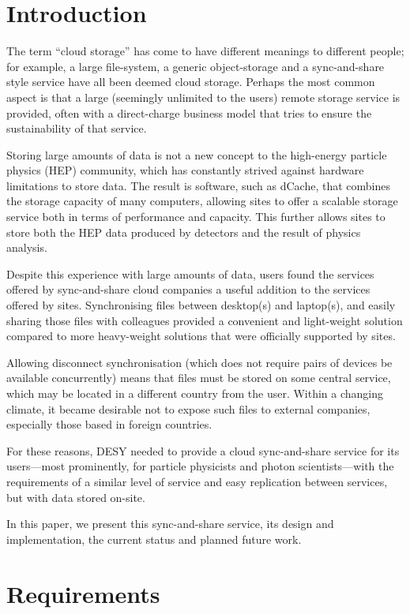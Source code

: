 \documentclass[a4paper]{jpconf}
\begin{document}
\section{Introduction}

The term ``cloud storage'' has come to have different meanings to
different people; for example, a large file-system, a generic
object-storage and a sync-and-share style service have all been deemed
cloud storage.  Perhaps the most common aspect is that a large
(seemingly unlimited to the users) remote storage service is provided,
often with a direct-charge business model that tries to ensure the
sustainability of that service.

Storing large amounts of data is not a new concept to the high-energy
particle physics (HEP) community, which has constantly strived against
hardware limitations to store data.  The result is software, such as
dCache\cite{dcache}, that combines the storage capacity of many
computers, allowing sites to offer a scalable storage service both in
terms of performance and capacity.  This further allows sites to store
both the HEP data produced by detectors and the result of physics
analysis.

Despite this experience with large amounts of data, users found the
services offered by sync-and-share cloud companies a useful addition
to the services offered by sites.  Synchronising files between
desktop(s) and laptop(s), and easily sharing those files with
colleagues provided a convenient and light-weight solution compared to
more heavy-weight solutions that were officially supported by sites.

Allowing disconnect synchronisation (which does not require pairs of
devices be available concurrently) means that files must be stored on
some central service, which may be located in a different country from
the user.  Within a changing climate, it became desirable not to
expose such files to external companies, especially those based in
foreign countries.

For these reasons, DESY needed to provide a cloud sync-and-share
service for its users---most prominently, for particle physicists and
photon scientists---with the requirements of a similar level of
service and easy replication between services, but with data stored
on-site.

In this paper, we present this sync-and-share service, its design and
implementation, the current status and planned future work.

\section{Requirements}
\end{document}
